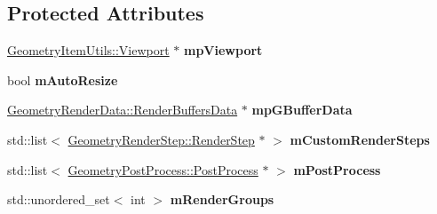 \subsection*{Protected Attributes}
\begin{DoxyCompactItemize}
\item 
\mbox{\label{class_geometry_engine_1_1_geometry_world_item_1_1_geometry_camera_1_1_camera_ab002ae029654b7cd634433817f16daa0}} 
\mbox{\hyperlink{class_geometry_engine_1_1_geometry_item_utils_1_1_viewport}{Geometry\+Item\+Utils\+::\+Viewport}} $\ast$ {\bfseries mp\+Viewport}
\item 
\mbox{\label{class_geometry_engine_1_1_geometry_world_item_1_1_geometry_camera_1_1_camera_aca8086ce2a9f8d830410695c98bdda27}} 
bool {\bfseries m\+Auto\+Resize}
\item 
\mbox{\label{class_geometry_engine_1_1_geometry_world_item_1_1_geometry_camera_1_1_camera_affc440b1a52ac342e462290c7bccf369}} 
\mbox{\hyperlink{class_geometry_engine_1_1_geometry_render_data_1_1_render_buffers_data}{Geometry\+Render\+Data\+::\+Render\+Buffers\+Data}} $\ast$ {\bfseries mp\+G\+Buffer\+Data}
\item 
\mbox{\label{class_geometry_engine_1_1_geometry_world_item_1_1_geometry_camera_1_1_camera_ab9ce7bb084093ecadaac30c6e5226979}} 
std\+::list$<$ \mbox{\hyperlink{class_geometry_engine_1_1_geometry_render_step_1_1_render_step}{Geometry\+Render\+Step\+::\+Render\+Step}} $\ast$ $>$ {\bfseries m\+Custom\+Render\+Steps}
\item 
\mbox{\label{class_geometry_engine_1_1_geometry_world_item_1_1_geometry_camera_1_1_camera_ad0878809e17d2f3c5e87743f856829c3}} 
std\+::list$<$ \mbox{\hyperlink{class_geometry_engine_1_1_geometry_post_process_1_1_post_process}{Geometry\+Post\+Process\+::\+Post\+Process}} $\ast$ $>$ {\bfseries m\+Post\+Process}
\item 
\mbox{\label{class_geometry_engine_1_1_geometry_world_item_1_1_geometry_camera_1_1_camera_af259aa784248dfb877f0d929e099f42f}} 
std\+::unordered\+\_\+set$<$ int $>$ {\bfseries m\+Render\+Groups}
\end{DoxyCompactItemize}


